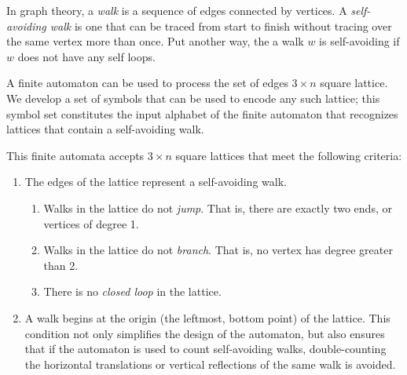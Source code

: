 \label{sec:statement}

In graph theory, a \emph{walk} is a sequence of edges connected by vertices. A \emph{self-avoiding walk} is one that can be traced from start to finish without tracing over the same vertex more than once. Put another way, the a walk $w$ is self-avoiding if $w$ does not have any self loops.

A finite automaton can be used to process the set of edges $3\times n$ square lattice. We develop a set of symbols that can be used to encode any such lattice; this symbol set constitutes the input alphabet of the finite automaton that recognizes lattices that contain a self-avoiding walk.

This finite automata accepts $3\times n$ square lattices that meet the following criteria:
\begin{enumerate}
\item The edges of the lattice represent a self-avoiding walk.
\begin{enumerate}
\item Walks in the lattice do not \emph{jump}. That is, there are exactly two ends, or vertices of degree 1.
\item Walks in the lattice do not \emph{branch}. That is, no vertex has degree greater than 2.
\item There is no \emph{closed loop} in the lattice.
\end{enumerate}
\item A walk begins at the origin (the leftmost, bottom point) of the lattice. This condition not only simplifies the design of the automaton, but also ensures that if the automaton is used to count self-avoiding walks, double-counting the horizontal translations or vertical reflections of the same walk is avoided.
\end{enumerate}
